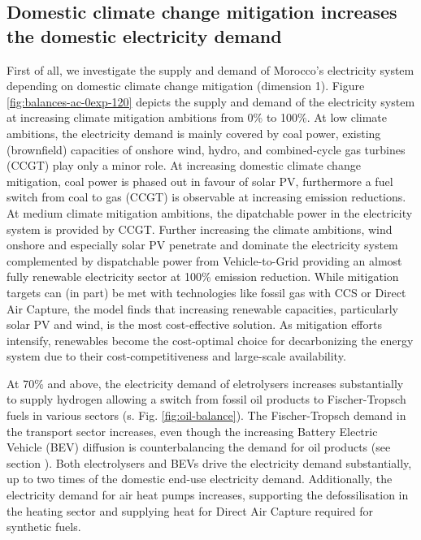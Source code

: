 \subsection*{Domestic climate change mitigation increases the domestic electricity demand}
\label{subsec:increase_limit}
First of all, we investigate the supply and demand of Morocco's electricity system depending on domestic climate change mitigation (dimension 1). Figure \ref{fig:balances-ac-0exp-120} depicts the supply and demand of the electricity system at increasing climate mitigation ambitions from 0\% to 100\%. At low climate ambitions, the electricity demand is mainly covered by coal power, existing (brownfield) capacities of onshore wind, hydro, and combined-cycle gas turbines (CCGT) play only a minor role. 
At increasing domestic climate change mitigation, coal power is phased out in favour of solar PV, furthermore a fuel switch from coal to gas (CCGT) is observable at increasing emission reductions. At medium climate mitigation ambitions, the dipatchable power in the electricity system is provided by CCGT. 
Further increasing the climate ambitions, wind onshore and especially solar PV penetrate and dominate the electricity system complemented by dispatchable power from Vehicle-to-Grid providing an almost fully renewable electricity sector at 100\% emission reduction. 
While mitigation targets can (in part) be met with technologies like fossil gas with CCS or Direct Air Capture, the model finds that increasing renewable capacities, particularly solar PV and wind, is the most cost-effective solution. As mitigation efforts intensify, renewables become the cost-optimal choice for decarbonizing the energy system due to their cost-competitiveness and large-scale availability.

At 70\% and above, the electricity demand of eletrolysers increases substantially to supply hydrogen allowing a switch from fossil oil products to Fischer-Tropsch fuels in various sectors (s. Fig. \ref{fig:oil-balance}). 
The Fischer-Tropsch demand in the transport sector increases, even though the increasing Battery Electric Vehicle (BEV) diffusion is counterbalancing the demand for oil products (see  section ). 
Both electrolysers and BEVs drive the electricity demand substantially, up to two times of the domestic end-use electricity demand. 
Additionally, the electricity demand for air heat pumps increases, supporting the defossilisation in the heating sector and supplying heat for Direct Air Capture required for synthetic fuels.


